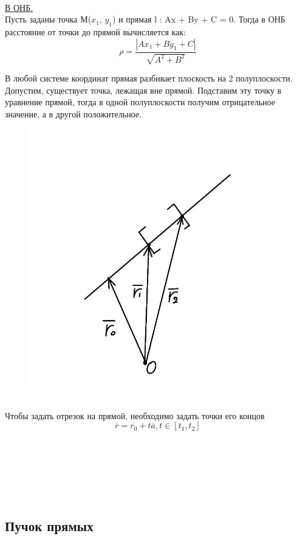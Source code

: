 \tab\\

\underline{В ОНБ.}\\

Пусть заданы точка М($x_1$, $y_1$) и прямая l : Ax + By + C = 0. Тогда в ОНБ расстояние от точки до прямой вычисляется как:
\[
\rho = \dfrac{|Ax_1 + By_1 + C|}{\sqrt{A^2 + B^2}}
\]

В любой системе координат прямая разбивает плоскость на 2 полуплоскости. Допустим, существует точка, лежащая вне прямой. Подставим эту точку в уравнение прямой, тогда в одной полуплоскости получим отрицательное значение, а в другой положительное.

\begin{figure}
	\includegraphics[width=0.84\linewidth]{images/1.4.jpeg}
\end{figure}

\tab\\

Чтобы задать отрезок на прямой, необходимо задать точки его концов
\[
\overline{r} = \overline{r_0} + t\overline{a}, t\in[t_1, t_2]
\]

\tab\\ \tab\\ \tab\\ \tab\\ \tab\\

\subsection{Пучок прямых}

